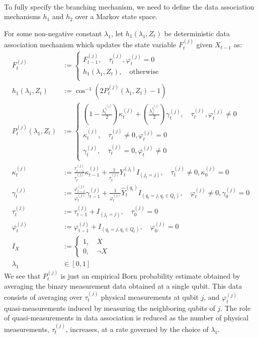 \\
To fully specify the branching mechanism, we need to define the data association mechanisms $h_1$ and $h_2$ over a Markov state space. 
\begin{defn} \label{qslam:dataassoc:h1}
	For some non-negative constant $\lambda_1$, let $h_1(\lambda_1, Z_t)$ be deterministic data association mechanism which updates the state variable $F_t^{(j)}$  given $X_{t-1}$ as:
	\begin{align}
	F_t^{(j)} &:= \begin{cases}
	F_{t-1}^{(j)}, \quad \tau_t^{(j)}, \varphi_t^{(j)} = 0 \\
	h_1(\lambda_1, Z_t), \quad \mathrm{otherwise}   \\
	\end{cases} \\
	h_1(\lambda_1, Z_t)& := \cos^{-1} (2P_t^{(j)}(\lambda_1, Z_t) - 1) \\
	P_t^{(j)}(\lambda_1, Z_t) &:= \begin{cases}
	\left( 1- \frac{\lambda_1^{\tau_t^{(j)}}}{2}\right)\kappa_{t}^{(j)} + \left(\frac{\lambda_1^{\tau_t^{(j)}}}{2}\right)\gamma_{t}^{(j)}, \quad \tau_t^{(j)}, \varphi_t^{(j)} \neq 0 \\
	\kappa_{t}^{(j)}, \quad \tau_t^{(j)}\neq 0, \varphi_t^{(j)} = 0 \\
	\gamma_{t}^{(j)}, \quad \tau_t^{(j)} = 0, \varphi_t^{(j)} \neq 0 \\
	\end{cases}\\
	\kappa_{t}^{(j)} &:= \frac{\tau_{t-1}^{(j)}}{\tau_{t}^{(j)}}  \kappa_{t-1}^{(j)} + \frac{1}{\tau_t^{(j)}} Y_t^{(j_t)}I_{(j_t = j)}, \quad \tau_t^{(j)} \neq 0, 	\kappa_{0}^{(j)} =0 \\
	\gamma_{t}^{(j)} &:= \frac{\varphi_{t-1}^{(j)} }{\varphi_{t}^{(j)}} \gamma_{t-1}^{(j)} + \frac{1}{\varphi_t^{(j)}} \hat{Y}_t^{(q_t)}I_{(q_t= j, q_t \in Q_t)} , \quad \varphi_t^{(j)} \neq 0, \gamma_{0}^{(j)} =0\\
	\tau_t^{(j)} &:= \tau_{t-1}^{(j)} + I_{(j_t = j)}, \quad \tau_0^{(j)} =0 \\
	\varphi_t^{(j)} &:= \varphi_{t-1}^{(j)} + I_{(q_t= j, q_t \in Q_t)}, \quad \varphi_0^{(j)} =0  \\
	I_{X} &:= \begin{cases}
	1, \quad X \\
	0, \quad \neg X 
	\end{cases} \\
	\lambda_1 &\in [0,1] 
	\end{align}
	We see that $P_t^{(j)}$ is just an empirical Born probability estimate obtained by averaging the binary measurement data obtained at a single qubit. This data consists of averaging over $\tau_t^{(j)}$ physical measurements at qubit $j$,  and $\varphi_t^{(j)}$ quasi-measurements induced by measuring the neighboring qubits of $j$. The role of quasi-measurements in data association is reduced as the number of physical measurements, $\tau_t^{(j)}$, increases, at a rate governed by the choice of $\lambda_1$.
	

\end{defn}
